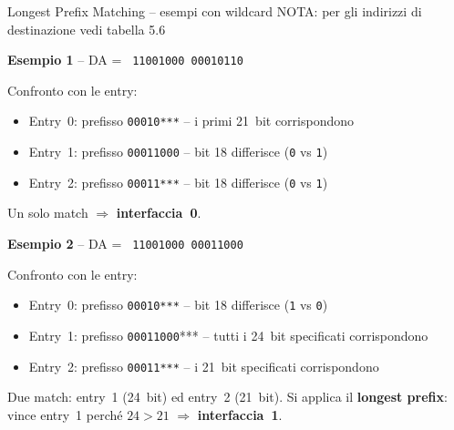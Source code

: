 \documentclass[a4paper,12pt]{report}
\begin{document}
\begin{esempiobox}{Longest Prefix Matching -- esempi con wildcard}
NOTA: per gli indirizzi di destinazione vedi tabella 5.6

\textbf{Esempio 1} -- DA =
\texttt{%
    11001000\;%
    \colorbox{cyan!30}{00010}110%
}

Confronto con le entry:
\begin{itemize}
    \item Entry~0: prefisso \texttt{\colorbox{cyan!30}{00010}***} -- i
          primi 21~bit corrispondono \checkmark
    \item Entry~1: prefisso \texttt{00011000} -- bit 18 differisce
          (\texttt{0} vs \texttt{1}) \texttimes
    \item Entry~2: prefisso \texttt{00011***} -- bit 18 differisce
          (\texttt{0} vs \texttt{1}) \texttimes
\end{itemize}
Un solo match $\Rightarrow$ \textbf{interfaccia~0}.

\vspace{0.4cm}

\textbf{Esempio 2} -- DA =
\texttt{%
    11001000\;%
    \colorbox{cyan!30}{00011000}%
}

Confronto con le entry:
\begin{itemize}
    \item Entry~0: prefisso \texttt{00010***} -- bit 18 differisce
          (\texttt{1} vs \texttt{0}) \texttimes
    \item Entry~1: prefisso \texttt{\colorbox{cyan!30}{00011000}}***
          -- tutti i 24~bit specificati corrispondono \checkmark
    \item Entry~2: prefisso \texttt{\colorbox{cyan!40}{00011}***}
          -- i 21~bit specificati corrispondono \checkmark
\end{itemize}
Due match: entry~1 (24~bit) ed entry~2 (21~bit).
Si applica il \textbf{longest prefix}: vince entry~1 perché
$24 > 21$ $\Rightarrow$ \textbf{interfaccia~1}.

\vspace{0.3cm}
\begin{center}
\end{center}

\end{esempiobox}
\end{document}
